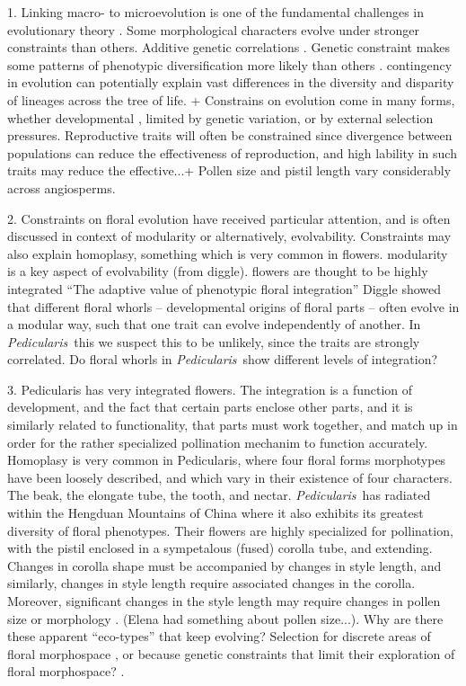\documentclass[12pt,letterpaper]{article}
\def\P{\emph{Pedicularis}}
\begin{document}
1. Linking macro- to microevolution is one of the fundamental challenges in
evolutionary theory \citep{chevurud_, schluter_ecological_2000, arnold_phenotypic_2014, futuyma_evolutionary_2010}. 
Some morphological characters evolve under stronger constraints than others. Additive genetic correlations \citep{}. \citep{kluge_predictability_1973, schluter_1996, arnold_2001}
Genetic constraint makes some patterns of phenotypic diversification more likely than others \cite{revell_phylogenetic_2007}.  contingency in evolution can potentially explain vast differences in the diversity and disparity of lineages across the tree of life. 
+ Constrains on evolution come in many forms, whether developmental \cite{}, 
limited by genetic variation, or by external selection pressures. Reproductive traits will often be constrained since divergence between populations   can reduce the effectiveness of reproduction, and high lability in such traits may reduce the effective...+ Pollen size and pistil length vary considerably across angiosperms.

2. Constraints on floral evolution have received particular attention, and is often discussed in context of modularity \citep{} or alternatively, evolvability. Constraints may also explain homoplasy, something which is very common in flowers. modularity is a key aspect of evolvability \citep{pigliucci} (from diggle).
flowers are thought to be highly integrated \citep{ordano}
``The adaptive value of phenotypic floral integration''
Diggle showed that different floral whorls -- developmental origins of floral parts -- often evolve in a modular way, such that one trait can evolve independently of another. In \P~this we suspect this to be unlikely, since the traits are strongly correlated. Do floral whorls in \P~show different levels of integration?

3. Pedicularis has very integrated flowers. The integration is a function of development, and the fact that certain parts enclose other parts, and it is similarly related to functionality, that parts must work together, and match up in order for the rather specialized pollination mechanim to function accurately. Homoplasy is very common in Pedicularis, where four floral forms morphotypes have been loosely described, and which vary in their existence of four characters. The beak, the elongate tube, the tooth, and nectar. 
\P~has radiated within the Hengduan Mountains of China where it also exhibits its greatest diversity of floral phenotypes. Their flowers are highly specialized for pollination, with the pistil enclosed in a sympetalous (fused) corolla tube, and extending. Changes in corolla shape must be accompanied by changes in style length, and similarly, changes in style length require associated changes in the corolla. Moreover, significant changes in the style length may require changes in pollen size or morphology \cite{}. (Elena had something about pollen size...). 
Why are there these apparent ``eco-types'' that keep evolving? Selection for discrete areas of floral morphospace \citep{}, or because genetic constraints that limit their exploration of floral morphospace? \citep{}. 
\end{document}
